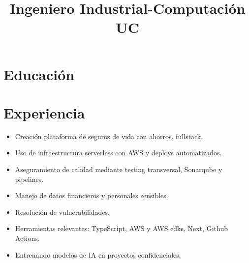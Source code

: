 \documentclass[11pt,a4paper,sans]{moderncv}
\title{Ingeniero Industrial-Computación UC}                               %
\begin{document}
\makecvtitle



\section{Educación}



\section{Experiencia}

{
    \begin{itemize}
        \item Creación plataforma de seguros de vida con ahorros, fullstack.
        \item Uso de infraestructura serverless con AWS y deploys automatizados.
        \item Aseguramiento de calidad mediante testing transversal, Sonarqube y pipelines.
        \item Manejo de datos financieros y personales sensibles.
        \item Resolución de vulnerabilidades.
        \item Herramientas relevantes: TypeScript, AWS y AWS cdks, Next, Github Actions.
    \end{itemize}
}


{
    \begin{itemize}
        \item Entrenando modelos de IA en proyectos confidenciales.
    \end{itemize}
}
\end{document}
